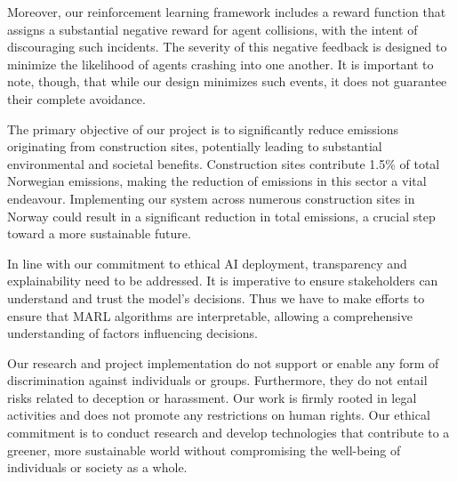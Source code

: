 \documentclass[conference]{IEEEtran}
\begin{document}
	Moreover, our reinforcement learning framework includes a reward function that assigns a substantial
	negative reward for agent collisions, with the intent of discouraging such incidents. The severity of
	this negative feedback is designed to minimize the likelihood of agents crashing into one another. It
	is important to note, though, that while our design minimizes such events, it does not guarantee their
	complete avoidance.


	The primary objective of our project is to significantly reduce \coo{} emissions originating from
	construction sites, potentially leading to substantial environmental and societal benefits.
	Construction sites contribute 1.5\% of total Norwegian \coo{} emissions, making the reduction of
	emissions in this sector a vital endeavour. Implementing our system across numerous construction sites
	in Norway could result in a significant reduction in total \coo{} emissions, a crucial step toward a more
	sustainable future.

	In line with our commitment to ethical AI deployment, transparency and explainability need to be
	addressed. It is imperative to ensure stakeholders can understand and trust the model's decisions.
	Thus we have to make efforts to ensure that MARL algorithms are interpretable, allowing a comprehensive
	understanding of factors influencing decisions.

	Our research and project implementation do not support or enable any form of discrimination against
	individuals or groups. Furthermore, they do not entail risks related to deception or harassment.
	Our work is firmly rooted in legal activities and does not promote any restrictions on human rights.
	Our ethical commitment is to conduct research and develop technologies that contribute to a greener,
	more sustainable world without compromising the well-being of individuals or society as a whole.

	\newpage


	\nocite{*}        %
	
	
\end{document}
